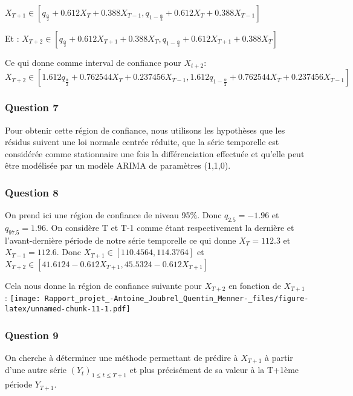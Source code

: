 \documentclass[
  landscape]{article}
\begin{document}
\(X_{T+1} \in \left[q_{\frac{\alpha}{2}} + 0.612X_{T} + 0.388X_{T-1}, q_{1-\frac{\alpha}{2}} + 0.612X_{T} + 0.388X_{T-1}\right]\)

Et :
\(X_{T+2} \in \left[q_{\frac{\alpha}{2}} + 0.612X_{T+1} + 0.388X_{T}, q_{1-\frac{\alpha}{2}} + 0.612X_{T+1} + 0.388X_{T}\right]\)

Ce qui donne comme interval de confiance pour \(X_{t+2}\):
\(X_{T+2} \in \left[1.612q_{\frac{\alpha}{2}} + 0.762544X_{T} + 0.237456X_{T-1}, 1.612q_{1-\frac{\alpha}{2}} + 0.762544X_{T} + 0.237456X_{T-1}\right]\)

\hypertarget{question-7}{%
\subsubsection{Question 7}\label{question-7}}

Pour obtenir cette région de confiance, nous utilisons les hypothèses
que les résidus suivent une loi normale centrée réduite, que la série
temporelle est considérée comme stationnaire une fois la différenciation
effectuée et qu'elle peut être modélisée par un modèle ARIMA de
paramètres (1,1,0).

\hypertarget{question-8}{%
\subsubsection{Question 8}\label{question-8}}

On prend ici une région de confiance de niveau 95\%. Donc
\(q_{2.5}=-1.96\) et \(q_{97.5}=1.96\). On considère T et T-1 comme
étant respectivement la dernière et l'avant-dernière période de notre
série temporelle ce qui donne \(X_{T}=112.3\) et \(X_{T-1}=112.6\). Donc
\(X_{T+1} \in \left[110.4564,114.3764\right]\) et
\(X_{T+2} \in \left[41.6124 - 0.612X_{T+1},45.5324 - 0.612X_{T+1}\right]\)

Cela nous donne la région de confiance suivante pour \(X_{T+2}\) en
fonction de \(X_{T+1}\) :
\texttt{[image: Rapport\_projet\_-Antoine\_Joubrel\_Quentin\_Menner-\_files/figure-latex/unnamed-chunk-11-1.pdf]}

\hypertarget{question-9}{%
\subsubsection{Question 9}\label{question-9}}

On cherche à déterminer une méthode permettant de prédire à \(X_{T+1}\)
à partir d'une autre série \((Y_{t})_{1 \leq t \leq T+1}\) et plus
précisément de sa valeur à la T+1ème période \(Y_{T+1}\).
\end{document}
